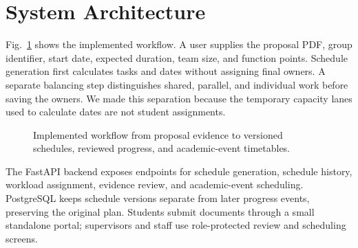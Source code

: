 \documentclass[conference]{IEEEtran}
\begin{document}
\section{System Architecture}

Fig.~\ref{fig:architecture} shows the implemented workflow. A user supplies the proposal PDF, group identifier, start date, expected duration, team size, and function points. Schedule generation first calculates tasks and dates without assigning final owners. A separate balancing step distinguishes shared, parallel, and individual work before saving the owners. We made this separation because the temporary capacity lanes used to calculate dates are not student assignments.

\begin{figure}[t]
\centering
{}
\caption{Implemented workflow from proposal evidence to versioned schedules, reviewed progress, and academic-event timetables.}
\label{fig:architecture}
\end{figure}

The FastAPI backend exposes endpoints for schedule generation, schedule history, workload assignment, evidence review, and academic-event scheduling. PostgreSQL keeps schedule versions separate from later progress events, preserving the original plan. Students submit documents through a small standalone portal; supervisors and staff use role-protected review and scheduling screens.
\end{document}
